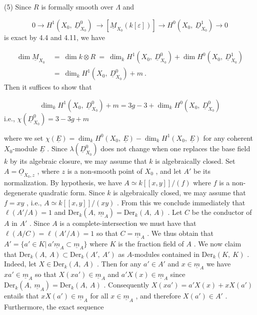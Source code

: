 (5)  Since  $R$  is formally smooth over  $\Lambda$  and

\begin{equation*}
0 \rightarrow H^1(X_0,\ \underline{D}^0_{X_0})\ \rightarrow [\underline{M}_{X_0}(k[\varepsilon])] \rightarrow H^0(X_0,\ \underline{D}^1_{X_0}) \rightarrow 0
\end{equation*}
is exact by 4.4 and 4.11, we have

\begin{equation*}
\begin{aligned}
\dim \underline{M}_{X_0} \ &= \ \dim k \otimes R \ = \ \dim_k H^1(X_0,\ \underline{D}^0_{X_0}) + \dim H^0(X_0,\ \underline{D}^1_{X_0})\\
&= \ \dim_k H^1(X_0,\ \underline{D}^0_{X_0}) + m \ .
\end{aligned}
\end{equation*}
Then it suffices to show that

\begin{equation*}
\dim_k H^1(X_0,\ \underline{D}^0_{X_0}) + m = 3g - 3 + \dim_k H^0(X_0,\ \underline{D}^0_{X_0})
\end{equation*}
i.e.,  $\chi(\underline{D}^0_{X_0}) = 3 - 3g + m$

where we set  $\chi(\underline{E}) = \dim_k H^0(X_0,\ \underline{E}) - \dim_k H^1(X_0,\ \underline{E})$  for any coherent  $X_0$-module  $\underline{E}$ . Since  $\lambda(\underline{D}^0_{X_0})$  does not change when one replaces the base field  $k$  by its algebraic closure, we may assume that  $k$  is algebraically closed. Set  $A = \underline{O}_{X_0,z}$ , where  $z$  is a non-smooth point of  $X_0$ , and let  $A'$  be its normalization. By hypothesis, we have  $A \simeq k[[x,y]]/(f)$  where  $f$  is a non-degenerate quadratic form. Since  $k$  is algebraically closed, we may assume that  $f = xy$ , i.e., $A \simeq k[[x,y]]/(xy)$ . From this we conclude immediately that  $\ell(A'/A) = 1$  and  $\mathrm{Der}_k(A,\ \underline{m}_A) = \mathrm{Der}_k(A,\ A)$ . Let  $C$  be the conductor of  $A$  in  $A'$ . Since $A$ is a complete-intersection we must have that  $\ell(A/C) = \ell(A'/A) = 1$  so that  $C = \underline{m}_A$ . We thus obtain that  $A' = \{a' \in K |\ a'\underline{m}_A \subset \underline{m}_A\}$  where  $K$  is the fraction field of  $A$ . We now claim that  $\mathrm{Der}_k(A,\ A) \subset \mathrm{Der}_k(A',\ A')$  as $A$-modules contained in  $\mathrm{Der}_k(K,\ K)$ . Indeed, let  $X \in \mathrm{Der}_k(A,\ A)$ . Then for any  $a' \in A'$  and
$x \in \underline{m}_A$  we have  $xa' \in \underline{m}_A$  so that  $X(xa') \in \underline{m}_A$  and  $a'X(x) \in \underline{m}_A$  since  $\mathrm{Der}_k(A,\ \underline{m}_A) = \mathrm{Der}_k(A,\ A)$ . Consequently  $X(xa') = a'X(x) + xX(a')$  entails that  $xX(a') \in \underline{m}_A$  for all  $x \in \underline{m}_A$ , and therefore  $X(a') \in A'$ . Furthermore, the exact sequence

